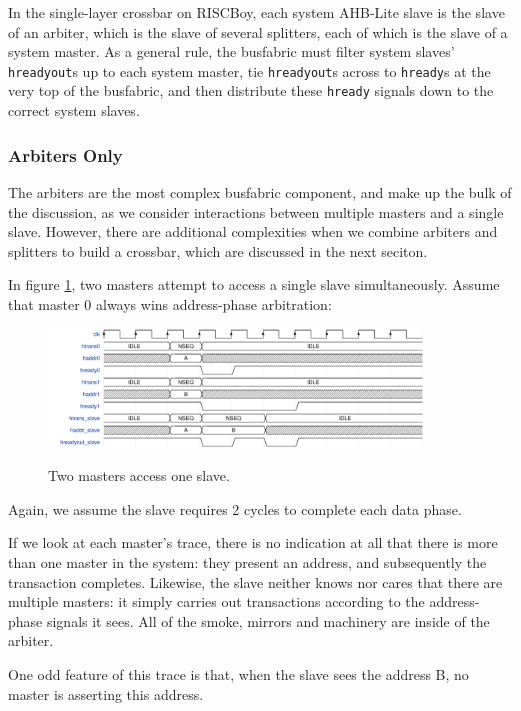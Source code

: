 \documentclass[notitlepage]{article}
\begin{document}
In the single-layer crossbar on RISCBoy, each system AHB-Lite slave is the slave of an arbiter, which is the slave of several splitters, each of which is the slave of a system master. As a general rule, the busfabric must filter system slaves' \texttt{hreadyout}s up to each system master, tie \texttt{hreadyout}s across to \texttt{hready}s at the very top of the busfabric, and then distribute these \texttt{hready} signals down to the correct system slaves.

\subsubsection{Arbiters Only}

The arbiters are the most complex busfabric component, and make up the bulk of the discussion, as we consider interactions between multiple masters and a single slave. However, there are additional complexities when we combine arbiters and splitters to build a crossbar, which are discussed in the next seciton.

In figure \ref{diagram:ahbl_mm_simult1}, two masters attempt to access a single slave simultaneously. Assume that master 0 always wins address-phase arbitration:

\begin{figure}[H]
\centering
\caption{Two masters access one slave.}
\includegraphics[width=0.9\textwidth]{waves/ahbl_mm_simult1.pdf}
\label{diagram:ahbl_mm_simult1}
\end{figure}

Again, we assume the slave requires 2 cycles to complete each data phase.

If we look at each master's trace, there is no indication at all that there is more than one master in the system: they present an address, and subsequently the transaction completes. Likewise, the slave neither knows nor cares that there are multiple masters: it simply carries out transactions according to the address-phase signals it sees. All of the smoke, mirrors and machinery are inside of the arbiter.

One odd feature of this trace is that, when the slave sees the address B, no master is asserting this address.
\end{document}
